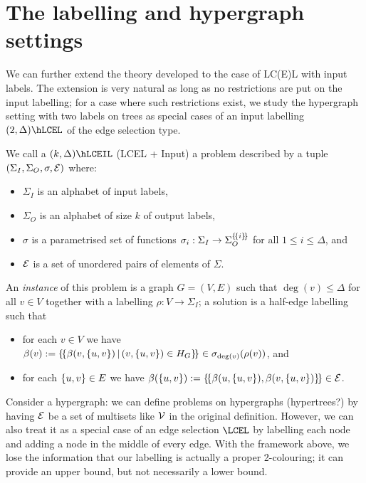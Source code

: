 \documentclass[12pt,a4paper]{article}
\begin{document}
\section{The labelling and hypergraph settings}
We can further extend the theory developed to the case of LC(E)L with input labels. The extension is very natural as long as no restrictions are put on the input labelling; for a case where such restrictions exist, we study the hypergraph setting with two labels on trees as special cases of an input labelling $(2,\Delta)\hLCEL$ of the edge selection type.
\begin{defn}
    We call a $(k,\Delta)\hLCEIL$ (LCEL + Input) a problem described by a tuple $(\Sigma_I,\Sigma_O,\sigma,\mathcal{E})$ where:
    \begin{itemize}
        \item $\Sigma_I$ is an alphabet of input labels,
        \item $\Sigma_O$ is an alphabet of size $k$ of output labels,
        \item $\sigma$ is a parametrised set of functions $\sigma_i:\Sigma_I\to\Sigma_O^{\left\lbrace \! \left\lbrace i\right\rbrace \! \right\rbrace}$ for all $1\leq i\leq\Delta$, and
        \item $\mathcal{E}$ is a set of unordered pairs of elements of $\Sigma$.
    \end{itemize}
    An \emph{instance} of this problem is a graph $G=(V,E)$ such that $\deg(v)\leq\Delta$ for all $v\in V$ together with a labelling $\rho:V\to\Sigma_I$; a solution is a half-edge labelling such that
    \begin{itemize}
        \item for each $v\in V$ we have $\beta(v):=\left\lbrace \! \left\lbrace\beta(v,\left\{u,v\right\})\,\middle|\, (v,\left\{u,v\right\})\in H_G\right\rbrace \! \right\rbrace\in\sigma_{\deg(v)}(\rho(v))$, and
        \item for each $\left\{u,v\right\}\in E$ we have $\beta(\left\{u,v\right\}):=\left\lbrace \! \left\lbrace\beta(u,\left\{u,v\right\}),\beta(v,\left\{u,v\right\})\right\rbrace \! \right\rbrace\in\mathcal{E}$.
    \end{itemize}
\end{defn}
Consider a hypergraph: we can define problems on hypergraphs (hypertrees?) by having $\mathcal{E}$ be a set of multisets like $\mathcal{V}$ in the original definition. However, we can also treat it as a special case of an edge selection $\LCEL$ by labelling each node  and adding a  node in the middle of every edge. With the framework above, we lose the information that our labelling is actually a proper 2-colouring; it can provide an upper bound, but not necessarily a lower bound.
\end{document}
